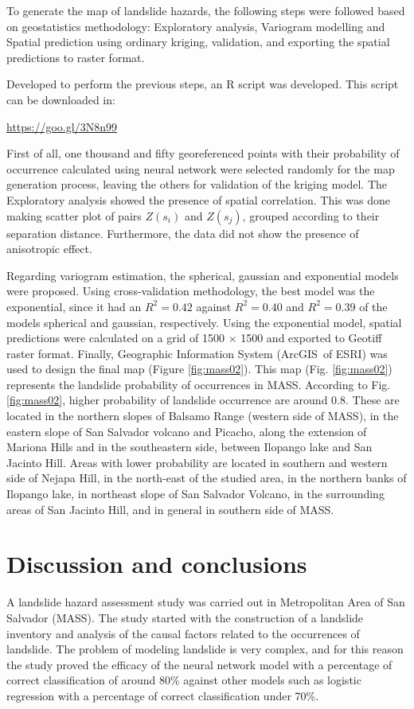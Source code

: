 \documentclass[11pt,twoside]{rmta2010eng}%
\begin{document}
To generate the map of landslide hazards, the following steps were followed based on geostatistics methodology: Exploratory analysis, Variogram modelling and Spatial prediction using ordinary kriging, validation, and exporting the spatial predictions to raster format. 

Developed to perform the previous steps, an R script was developed. This script can be downloaded in:

\url{https://goo.gl/3N8n99}

First of all, one thousand and fifty georeferenced points with their probability of occurrence calculated using neural network were selected randomly for the map generation process, leaving the others for validation of the kriging model. The Exploratory analysis showed the presence of spatial correlation. This was done making scatter plot of pairs $Z(s_{i})$ and  $Z(s_{j})$, grouped according to their separation distance. Furthermore, the data did not show the presence of anisotropic effect. 

Regarding variogram estimation, the spherical, gaussian and exponential models were proposed. Using cross-validation methodology, the best model was the exponential, since it had an $ R^{2} = 0.42 $ against $ R^{2} = 0.40 $ and $ R^{2} = 0.39 $ of the models spherical and gaussian, respectively. Using the exponential model, spatial predictions were calculated on a grid of 1500 $\times$ 1500 and exported to Geotiff raster format. Finally, Geographic Information System (ArcGIS\textregistered \  of ESRI) was used to design the final map (Figure \ref{fig:mass02}). This map (Fig. \ref{fig:mass02}) represents the landslide probability of occurrences in MASS. According to Fig. \ref{fig:mass02}, higher probability of landslide occurrence are around 0.8. These are located in the northern slopes of Balsamo Range (western side of MASS), in the eastern slope of San Salvador volcano and Picacho,  along the extension of Mariona Hills  and in the southeastern side, between Ilopango lake and San Jacinto Hill. Areas with lower probability are located in southern and western side of Nejapa Hill, in the north-east of the studied area, in the northern banks of Ilopango lake, in northeast slope of San Salvador Volcano, in the surrounding areas of San Jacinto Hill, and in general in southern side of MASS. 





\section{Discussion and conclusions}
A landslide hazard assessment study was carried out in Metropolitan Area of San Salvador (MASS). The study started with the construction of a landslide inventory and analysis of the causal factors related to the occurrences of landslide. The problem of modeling landslide is very complex, and for this reason the study proved the efficacy of the neural network model with a percentage of correct classification of around 80\% against other models such as logistic regression with a percentage of correct classification under 70\%. 
\end{document}
